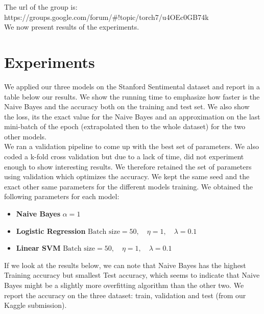 \documentclass[11pt]{article}
\begin{document}
\noindent The url of the group is: https://groups.google.com/forum/\#!topic/torch7/u4OEc0GB74k\\

\noindent We now present results of the experiments.

\section{Experiments}

We applied our three models on the Stanford Sentimental dataset and report in a table below our results. We show the running time to emphasize how faster is the Naive Bayes and the accuracy both on the training and test set. We also show the loss, its the exact value for the Naive Bayes and an approximation on the last mini-batch of the epoch (extrapolated then to the whole dataset) for the two other models.\\

\noindent We ran a validation pipeline to come up with the best set of parameters. We also coded a k-fold cross validation but due to a lack of time, did not experiment enough to show interesting results. We therefore retained the set of parameters using validation which optimizes the accuracy. We kept the same seed and the exact other same parameters for the different models training. We obtained the following parameters for each model:

\begin{itemize}
	\item \textbf{Naive Bayes} $\alpha = 1$
	\item \textbf{Logistic Regression} $\text{Batch size} = 50,\quad \eta = 1, \quad \lambda = 0.1$
	\item \textbf{Linear SVM} $\text{Batch size} = 50,\quad \eta = 1, \quad \lambda = 0.1$\\
\end{itemize}

If we look at the results below, we can note that Naive Bayes has the highest Training accuracy but smallest Test accuracy, which seems to indicate that Naive Bayes might be a slightly more overfitting algorithm than the other two. We report the accuracy on the three dataset: train, validation and test (from our Kaggle submission).\\
\end{document}
